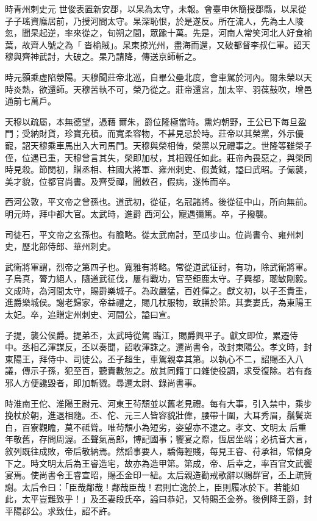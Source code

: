\begin{pinyinscope}
 時青州刺史元
 世俊表置新安郡，以杲為太守，未報。會臺申休簡授郡縣，以杲從子子瑤資廕居前，乃授河間太守。杲深恥恨，於是遂反。所在流人，先為土人陵忽，聞杲起逆，率來從之，旬朔之間，眾踰十萬。先是，河南人常笑河北人好食榆葉，故齊人號之為「沓榆賊」。杲東掠光州，盡海而還，又破都督李叔仁軍。詔天穆與齊神武討，大破之。杲乃請降，傳送京師斬之。



 時元顥乘虛陷滎陽。天穆聞莊帝北巡，自畢公壘北度，會車駕於河內。爾朱榮以天時炎熱，欲還師。天穆苦執不可，榮乃從之。莊帝還宮，加太宰、羽葆鼓吹，增邑通前七萬戶。



 天穆以疏屬，本無德望，憑藉
 爾朱，爵位隆極當時。熏灼朝野，王公已下每旦盈門；受納財貨，珍寶充積。而寬柔容物，不甚見忌於時。莊帝以其榮黨，外示優寵，詔天穆乘車馬出入大司馬門。天穆與榮相倚，榮黨以兄禮事之。世隆等雖榮子侄，位遇已重，天穆曾言其失，榮即加杖，其相親任如此。莊帝內畏惡之，與榮同時見殺。節閔初，贈丞相、柱國大將軍、雍州刺史、假黃鉞，謚曰武昭。子儼襲，美才貌，位都官尚書。及齊受禪，聞敕召，假病，遂怖而卒。



 西河公敦，平文帝之曾孫也。道武初，從征，名冠諸將。後從征中山，所向無前。明元時，拜中都大官。太武時，進爵
 西河公，寵遇彌篤。卒，子撥襲。



 司徒石，平文帝之玄孫也。有膽略。從太武南討，至瓜步山。位尚書令、雍州刺史，歷北部侍郎、華州刺史。



 武衛將軍謂，烈帝之第四子也。寬雅有將略。常從道武征討，有功，除武衛將軍。子烏真，膂力絕人，隨道武征伐，屢有戰功，官至鉅鹿太守。子興都，聰敏剛毅。文成時，為河間太守，賜爵樂城子。為政嚴猛，百姓憚之。獻文初，以子丕貴重，進爵樂城侯。謝老歸家，帝益禮之，賜几杖服物，致膳於第。其妻婁氏，為東陽王太妃。卒，追贈定州刺史、河間公，謚曰宣。



 子提，襲公侯爵。提弟丕，太武時從駕
 臨江，賜爵興平子。獻文即位，累遷侍中。丞相乙渾謀反，丕以奏聞，詔收渾誅之。遷尚書令，改封東陽公。孝文時，封東陽王，拜侍中、司徒公。丕子超生，車駕親幸其第。以執心不二，詔賜丕入八議，傳示子孫，犯至百，聽責數恕之。放其同籍丁口雜使役調，求受復除。若有姦邪人方便讒毀者，即加斬戮。尋遷太尉、錄尚書事。



 時淮南王佗、淮陽王尉元、河東王茍頹並以舊老見禮。每有大事，引入禁中，乘步挽杖於朝，進退相隨。丕、佗、元三人皆容貌壯偉，腰帶十圍，大耳秀眉，鬚鬢斑白，百寮觀瞻，莫不祗聳。唯茍頹小為短劣，姿望亦不逮之。孝文、文明太
 后重年敬舊，存問周渥。丕聲氣高郎，博記國事；饗宴之際，恆居坐端；必抗音大言，敘列既往成敗，帝后敬納焉。然謟事要人，驕侮輕賤，每見王睿、苻承祖，常傾身下之。時文明太后為王睿造宅，故亦為造甲第。第成，帝、后幸之，率百官文武饗宴焉。使尚書令王睿宣昭，賜丕金印一紐。太后親造勸戒歌辭以賜群官，丕上疏贊謝。太后令曰：「臣哉鄰哉！鄰哉臣哉！君則亡逸於上，臣則履冰於下。若能如此，太平豈難致乎！」及丕妻段氏卒，謚曰恭妃，又特賜丕金券。後例降王爵，封平陽郡公。求致仕，詔不許。




\end{pinyinscope}
